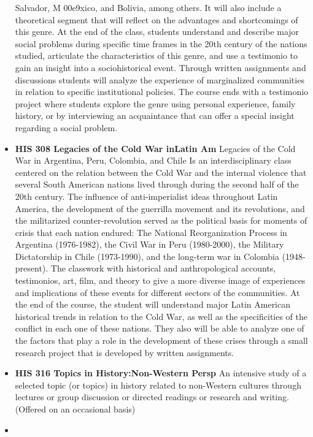 \documentclass[
  letterpaper,
]{scrbook}
\begin{document}
\begin{itemize}
  Salvador, M 00e9xico, and Bolivia, among others. It will also include
  a theoretical segment that will reflect on the advantages and
  shortcomings of this genre. At the end of the class, students
  understand and describe major social problems during specific time
  frames in the 20th century of the nations studied, articulate the
  characteristics of this genre, and use a testimonio to gain an insight
  into a sociohistorical event. Through written assignments and
  discussions students will analyze the experience of marginalized
  communities in relation to specific institutional policies. The course
  ends with a testimonio project where students explore the genre using
  personal experience, family history, or by interviewing an
  acquaintance that can offer a special insight regarding a social
  problem.
\item
  \textbf{HIS 308 Legacies of the Cold War inLatin Am} Legacies of the
  Cold War in Argentina, Peru, Colombia, and Chile Is an
  interdisciplinary class centered on the relation between the Cold War
  and the internal violence that several South American nations lived
  through during the second half of the 20th century. The influence of
  anti-imperialist ideas throughout Latin America, the development of
  the guerrilla movement and its revolutions, and the militarized
  counter-revolution served as the political basis for moments of crisis
  that each nation endured: The National Reorganization Process in
  Argentina (1976-1982), the Civil War in Peru (1980-2000), the Military
  Dictatorship in Chile (1973-1990), and the long-term war in Colombia
  (1948-present). The classwork with historical and anthropological
  accounts, testimonios, art, film, and theory to give a more diverse
  image of experiences and implications of these events for different
  sectors of the communities. At the end of the course, the student will
  understand major Latin American historical trends in relation to the
  Cold War, as well as the specificities of the conflict in each one of
  these nations. They also will be able to analyze one of the factors
  that play a role in the development of these crises through a small
  research project that is developed by written assignments.
\item
  \textbf{HIS 316 Topics in History:Non-Western Persp} An intensive
  study of a selected topic (or topics) in history related to
  non-Western cultures through lectures or group discussion or directed
  readings or research and writing. (Offered on an occasional basis)
\item

\end{itemize}
\end{document}
